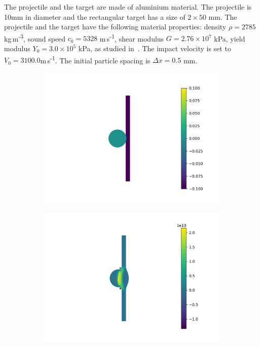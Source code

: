 The projectile and the target are made of aluminium material. The projectile
is 10mm in diameter and the rectangular target has a size of $2 \times 50$ mm.
The projectile and the target have the following material properties: density
$\rho = 2785 $ kg\,m\textsuperscript{-3}, sound speed $c_0 = 5328$
 m\,s\textsuperscript{-1}, shear modulus $G=2.76 \times 10^{7}$ kPa, yield modulus
$Y_0 = 3.0 \times 10^{5}$ kPa, as studied in~\citep{zhang_hu_adams17}. The impact velocity is set to
$V_0 = 3100.0$m\,s\textsuperscript{-1}. The initial particle spacing is
$\Delta x = 0.5$ mm.
\begin{figure}
  \centering
  \begin{subfigure}{0.3\textwidth}
    \centering
    \includegraphics[width=1.0\textwidth]{figures/ctvf/figures/high_velocity_impact/etvf_sun2019/time0}
    \label{}
  \end{subfigure}
%
  \begin{subfigure}{0.3\textwidth}
    \centering
    \includegraphics[width=1.0\textwidth]{figures/ctvf/figures/high_velocity_impact/etvf_sun2019/time1}

\end{subfigure}
\end{figure}
